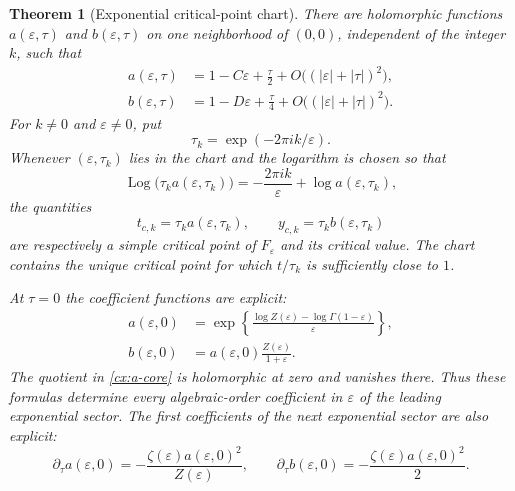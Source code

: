 \documentclass[11pt,a4paper]{article}
\numberwithin{equation}{section}
\newtheorem{theorem}{Theorem}[section]
\theoremstyle{definition}
\theoremstyle{remark}
\DeclareMathOperator{\Log}{Log}
\begin{document}
\begin{theorem}[Exponential critical-point chart]\label{cx:critical-chart}
There are holomorphic functions $a(\varepsilon,\tau)$ and
$b(\varepsilon,\tau)$ on one neighborhood of $(0,0)$, independent of the
integer $k$, such that
\begin{align}
 a(\varepsilon,\tau)&=1-C\varepsilon+\frac\tau2
                    +O\bigl((|\varepsilon|+|\tau|)^2\bigr),
 \label{cx:a-first}\\
 b(\varepsilon,\tau)&=1-D\varepsilon+\frac\tau4
                    +O\bigl((|\varepsilon|+|\tau|)^2\bigr).
 \label{cx:b-first}
\end{align}
For $k\ne0$ and $\varepsilon\ne0$, put
\begin{equation}\label{cx:tau}
 \tau_k=\exp(-2\pi i k/\varepsilon).
\end{equation}
Whenever $(\varepsilon,\tau_k)$ lies in the chart and the logarithm is
chosen so that
\begin{equation}\label{cx:log-compatibility}
 \Log\!\bigl(\tau_k a(\varepsilon,\tau_k)\bigr)
  =-\frac{2\pi i k}{\varepsilon}
                  +\log a(\varepsilon,\tau_k),
\end{equation}
the quantities
\begin{equation}\label{cx:critical-values}
 t_{c,k}=\tau_k a(\varepsilon,\tau_k),\qquad
 y_{c,k}=\tau_k b(\varepsilon,\tau_k)
\end{equation}
are respectively a simple critical point of $F_\varepsilon$ and its
critical value.  The chart contains the unique critical point for which
$t/\tau_k$ is sufficiently close to $1$.

At $\tau=0$ the coefficient functions are explicit:
\begin{align}
 a(\varepsilon,0)
 &=\exp\left\{
    \frac{\log Z(\varepsilon)-\log\Gamma(1-\varepsilon)}{\varepsilon}
          \right\},\label{cx:a-core}\\
 b(\varepsilon,0)&=
       a(\varepsilon,0)\frac{Z(\varepsilon)}{1+\varepsilon}.
 \label{cx:b-core}
\end{align}
The quotient in \eqref{cx:a-core} is holomorphic at zero and vanishes
there.  Thus these formulas determine every algebraic-order coefficient
in $\varepsilon$ of the leading exponential sector.
The first coefficients of the next exponential sector are also explicit:
\begin{equation}\label{cx:next-critical-sector}
 \partial_\tau a(\varepsilon,0)
   =-\frac{\zeta(\varepsilon)a(\varepsilon,0)^2}{Z(\varepsilon)},
 \qquad
 \partial_\tau b(\varepsilon,0)
   =-\frac{\zeta(\varepsilon)a(\varepsilon,0)^2}{2}.
\end{equation}
\end{theorem}
\end{document}
